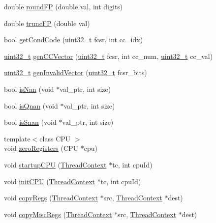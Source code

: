 \begin{DoxyCompactItemize}
\item 
double \hyperlink{namespaceMipsISA_a4205d010266118ca5ba2e7f99f6161f8}{roundFP} (double val, int digits)
\item 
double \hyperlink{namespaceMipsISA_a757a04b4d813824b1f006a8223f37966}{truncFP} (double val)
\item 
bool \hyperlink{namespaceMipsISA_a03ccbfe054e56369bcfef50d0e9e9284}{getCondCode} (\hyperlink{Type_8hh_a435d1572bf3f880d55459d9805097f62}{uint32\_\-t} fcsr, int cc\_\-idx)
\item 
\hyperlink{Type_8hh_a435d1572bf3f880d55459d9805097f62}{uint32\_\-t} \hyperlink{namespaceMipsISA_ab28e8a16ffbefccfa65df228a13bbfe2}{genCCVector} (\hyperlink{Type_8hh_a435d1572bf3f880d55459d9805097f62}{uint32\_\-t} fcsr, int cc\_\-num, \hyperlink{Type_8hh_a435d1572bf3f880d55459d9805097f62}{uint32\_\-t} cc\_\-val)
\item 
\hyperlink{Type_8hh_a435d1572bf3f880d55459d9805097f62}{uint32\_\-t} \hyperlink{namespaceMipsISA_ac248600d7063a3175e01d23e0341ed2f}{genInvalidVector} (\hyperlink{Type_8hh_a435d1572bf3f880d55459d9805097f62}{uint32\_\-t} fcsr\_\-bits)
\item 
bool \hyperlink{namespaceMipsISA_acd4560888a946cc49bfa4e4714576355}{isNan} (void $\ast$val\_\-ptr, int size)
\item 
bool \hyperlink{namespaceMipsISA_ac73ebd248ede21383ddd8a84978d5dbd}{isQnan} (void $\ast$val\_\-ptr, int size)
\item 
bool \hyperlink{namespaceMipsISA_a688fdecf4f2d2faf933cb4085c72c003}{isSnan} (void $\ast$val\_\-ptr, int size)
\item 
{\footnotesize template$<$class CPU $>$ }\\void \hyperlink{namespaceMipsISA_a2f96efaaa88b587ab5b29ded7264960e}{zeroRegisters} (CPU $\ast$cpu)
\item 
void \hyperlink{namespaceMipsISA_a343e9193078845bb700799b0c7f24d2a}{startupCPU} (\hyperlink{classThreadContext}{ThreadContext} $\ast$tc, int cpuId)
\item 
void \hyperlink{namespaceMipsISA_aded557a1e716c6f849b0e0b05fc77676}{initCPU} (\hyperlink{classThreadContext}{ThreadContext} $\ast$tc, int cpuId)
\item 
void \hyperlink{namespaceMipsISA_aaeffcccf262b0dbd3cbcc8b4cef41168}{copyRegs} (\hyperlink{classThreadContext}{ThreadContext} $\ast$src, \hyperlink{classThreadContext}{ThreadContext} $\ast$dest)
\item 
void \hyperlink{namespaceMipsISA_a42833096094e5ff0f2de948bf8e5965c}{copyMiscRegs} (\hyperlink{classThreadContext}{ThreadContext} $\ast$src, \hyperlink{classThreadContext}{ThreadContext} $\ast$dest)

\end{DoxyCompactItemize}
